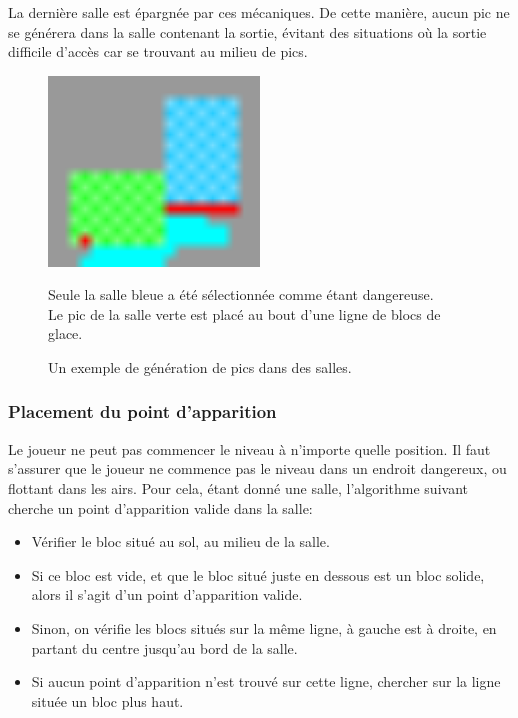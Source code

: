 \documentclass[10pt]{report}
\begin{document}
La dernière salle est épargnée par ces mécaniques.
De cette manière, aucun pic ne se générera dans la salle contenant la sortie, évitant des situations où la sortie
difficile d'accès car se trouvant au milieu de pics.

  \begin{figure}[H]
  \centering
  \includegraphics[width=0.5\textwidth]{images/ice_spike_trap}
  \caption{Un exemple de génération de pics dans des salles.}
  Seule la salle bleue a été sélectionnée comme étant dangereuse.\\
  Le pic de la salle verte est placé au bout d'une ligne de blocs de glace.
  \label{fig:spike_placement}
\end{figure}

\subsubsection{Placement du point d'apparition}
\label{subsubsec:spawn_point}

Le joueur ne peut pas commencer le niveau à n'importe quelle position.
Il faut s'assurer que le joueur ne commence pas le niveau dans un endroit dangereux, ou flottant dans les airs.
Pour cela, étant donné une salle, l'algorithme suivant cherche un point d'apparition valide dans la salle:

\begin{itemize}
  \item Vérifier le bloc situé au sol, au milieu de la salle.
  \item Si ce bloc est vide, et que le bloc situé juste en dessous est un bloc solide, alors il s'agit d'un
  point d'apparition valide.
  \item Sinon, on vérifie les blocs situés sur la même ligne, à gauche est à droite, en partant du centre jusqu'au
  bord de la salle.
  \item Si aucun point d'apparition n'est trouvé sur cette ligne, chercher sur la ligne située un bloc plus haut.
\end{itemize}
\end{document}
